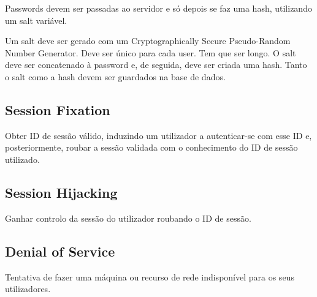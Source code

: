 \documentclass[../resumosLTW.tex]{subfiles}
\begin{document}
Passwords devem ser passadas ao servidor e só depois se faz uma hash, utilizando um salt variável.

Um salt deve ser gerado com um Cryptographically Secure Pseudo-Random Number Generator. 
Deve ser único para cada user.
Tem que ser longo.
O salt deve ser concatenado à password e, de seguida, deve ser criada uma hash.
Tanto o salt como a hash devem ser guardados na base de dados.

\subsection{Session Fixation}

Obter ID de sessão válido, induzindo um utilizador a autenticar-se com esse ID e, posteriormente, roubar a sessão validada com o conhecimento do ID de sessão utilizado.

\subsection{Session Hijacking}

Ganhar controlo da sessão do utilizador roubando o ID de sessão.

\subsection{Denial of Service}

Tentativa de fazer uma máquina ou recurso de rede indisponível para os seus utilizadores.
\end{document}
